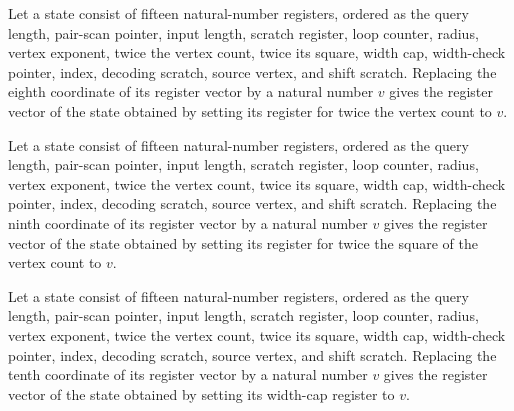 \begin{lemma}
\label{Complexity.PathHard.St.upd_n}
\leanok
{}
Let a state consist of fifteen natural-number registers, ordered as the query length,
pair-scan pointer, input length, scratch register, loop counter, radius, vertex
exponent, twice the vertex count, twice its square, width cap, width-check pointer,
index, decoding scratch, source vertex, and shift scratch. Replacing the eighth
coordinate of its register vector by a natural number $v$ gives the register vector of
the state obtained by setting its register for twice the vertex count to $v$.
\end{lemma}

\begin{lemma}
\label{Complexity.PathHard.St.upd_m}
\leanok
{}
Let a state consist of fifteen natural-number registers, ordered as the query length,
pair-scan pointer, input length, scratch register, loop counter, radius, vertex
exponent, twice the vertex count, twice its square, width cap, width-check pointer,
index, decoding scratch, source vertex, and shift scratch. Replacing the ninth
coordinate of its register vector by a natural number $v$ gives the register vector of
the state obtained by setting its register for twice the square of the vertex count to
$v$.
\end{lemma}

\begin{lemma}
\label{Complexity.PathHard.St.upd_k}
\leanok
{}
Let a state consist of fifteen natural-number registers, ordered as the query length,
pair-scan pointer, input length, scratch register, loop counter, radius, vertex
exponent, twice the vertex count, twice its square, width cap, width-check pointer,
index, decoding scratch, source vertex, and shift scratch. Replacing the tenth
coordinate of its register vector by a natural number $v$ gives the register vector of
the state obtained by setting its width-cap register to $v$.
\end{lemma}

